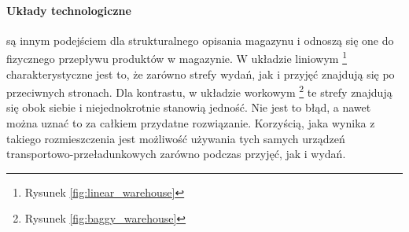 		\paragraph{Układy technologiczne} są innym podejściem dla strukturalnego opisania magazynu i odnoszą się
		one do fizycznego przepływu produktów w magazynie. W układzie liniowym \footnote{Rysunek \ref{fig:linear_warehouse}} 
		charakterystyczne jest to, że zarówno strefy wydań, jak i przyjęć znajdują się po przeciwnych stronach. Dla kontrastu,
		w układzie workowym \footnote{Rysunek \ref{fig:baggy_warehouse}} te strefy znajdują się obok siebie i niejednokrotnie
		stanowią jedność. Nie jest to błąd, a nawet można uznać to za całkiem przydatne rozwiązanie. Korzyścią, jaka 
		wynika z takiego rozmieszczenia jest możliwość używania tych samych urządzeń transportowo-przeładunkowych zarówno
		podczas przyjęć, jak i wydań. 
		
